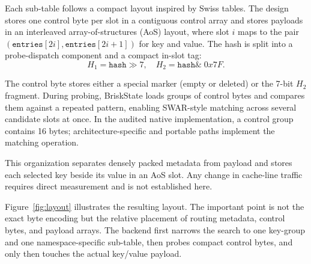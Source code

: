 \documentclass[journal]{IEEEtran}
\newcommand{\briskstate}{BriskState\xspace}
\newcommand{\system}{\briskstate}
\begin{document}
Each sub-table follows a compact layout inspired by Swiss tables. The design stores one control byte per slot in a contiguous control array and stores payloads in an interleaved array-of-structures (AoS) layout, where slot $i$ maps to the pair $(\texttt{entries}[2i], \texttt{entries}[2i+1])$ for key and value. The hash is split into a probe-dispatch component and a compact in-slot tag:
\begin{equation}
H_1 = \texttt{hash} \gg 7, \quad H_2 = \texttt{hash} \&\; 0x7F.
\end{equation}

The control byte stores either a special marker (empty or deleted) or the 7-bit $H_2$ fragment. During probing, \system loads groups of control bytes and compares them against a repeated pattern, enabling SWAR-style matching across several candidate slots at once. In the audited native implementation, a control group contains 16 bytes; architecture-specific and portable paths implement the matching operation.

This organization separates densely packed metadata from payload and stores each selected key beside its value in an AoS slot. Any change in cache-line traffic requires direct measurement and is not established here.

Figure~\ref{fig:layout} illustrates the resulting layout. The important point is not the exact byte encoding but the relative placement of routing metadata, control bytes, and payload arrays. The backend first narrows the search to one key-group and one namespace-specific sub-table, then probes compact control bytes, and only then touches the actual key/value payload.
\end{document}
